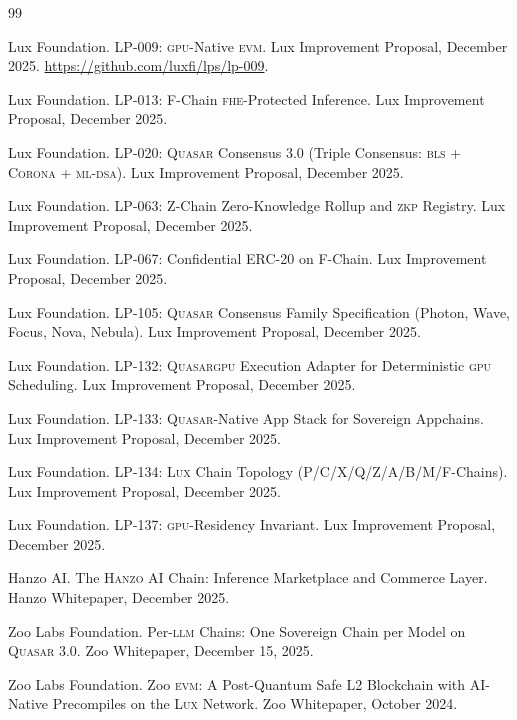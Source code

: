 \documentclass[11pt,letterpaper]{article}
\newcommand{\Lux}{\textsc{Lux}}
\newcommand{\Hanzo}{\textsc{Hanzo}}
\newcommand{\Quasar}{\textsc{Quasar}}
\newcommand{\QuasarGPU}{\textsc{Quasar}\textsc{gpu}}
\newcommand{\LLM}{\textsc{llm}}
\newcommand{\GPU}{\textsc{gpu}}
\newcommand{\FHE}{\textsc{fhe}}
\newcommand{\ZKP}{\textsc{zkp}}
\newcommand{\BLS}{\textsc{bls}}
\newcommand{\MLDSA}{\textsc{ml-dsa}}
\newcommand{\Corona}{\textsc{Corona}}
\begin{document}
\begin{thebibliography}{99}

Lux Foundation.
\newblock LP-009: \GPU{}-Native \textsc{evm}.
\newblock Lux Improvement Proposal, December 2025.
\newblock \url{https://github.com/luxfi/lps/lp-009}.

Lux Foundation.
\newblock LP-013: F-Chain \FHE{}-Protected Inference.
\newblock Lux Improvement Proposal, December 2025.

Lux Foundation.
\newblock LP-020: \Quasar{} Consensus 3.0 (Triple Consensus: \BLS{} + \Corona{} + \MLDSA{}).
\newblock Lux Improvement Proposal, December 2025.

Lux Foundation.
\newblock LP-063: Z-Chain Zero-Knowledge Rollup and \ZKP{} Registry.
\newblock Lux Improvement Proposal, December 2025.

Lux Foundation.
\newblock LP-067: Confidential ERC-20 on F-Chain.
\newblock Lux Improvement Proposal, December 2025.

Lux Foundation.
\newblock LP-105: \Quasar{} Consensus Family Specification (Photon, Wave, Focus, Nova, Nebula).
\newblock Lux Improvement Proposal, December 2025.

Lux Foundation.
\newblock LP-132: \QuasarGPU{} Execution Adapter for Deterministic \GPU{} Scheduling.
\newblock Lux Improvement Proposal, December 2025.

Lux Foundation.
\newblock LP-133: \Quasar{}-Native App Stack for Sovereign Appchains.
\newblock Lux Improvement Proposal, December 2025.

Lux Foundation.
\newblock LP-134: \Lux{} Chain Topology (P/C/X/Q/Z/A/B/M/F-Chains).
\newblock Lux Improvement Proposal, December 2025.

Lux Foundation.
\newblock LP-137: \GPU{}-Residency Invariant.
\newblock Lux Improvement Proposal, December 2025.

Hanzo AI.
\newblock The \Hanzo{} AI Chain: Inference Marketplace and Commerce Layer.
\newblock Hanzo Whitepaper, December 2025.

Zoo Labs Foundation.
\newblock Per-\LLM{} Chains: One Sovereign Chain per Model on \Quasar{} 3.0.
\newblock Zoo Whitepaper, December 15, 2025.

Zoo Labs Foundation.
\newblock Zoo \textsc{evm}: A Post-Quantum Safe L2 Blockchain with AI-Native Precompiles on the \Lux{} Network.
\newblock Zoo Whitepaper, October 2024.


\end{thebibliography}
\end{document}
